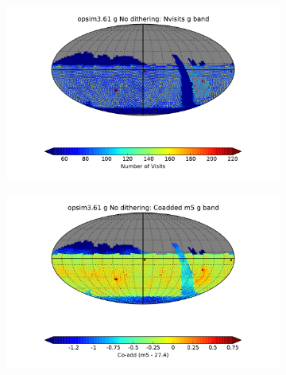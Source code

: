 \documentclass[]{spie}  %
\begin{document}
\begin{figure}
\begin{center}
\begin{subfigure}[b]{0.48\textwidth}
\includegraphics[width=\textwidth]{figures/opsim3_61_Nvisits_g_band_g_No_dithering_HEAL_SkyMap}
\caption{}
\label{subfig:gbanda}
\end{subfigure}
\begin{subfigure}[b]{0.48\textwidth}
\includegraphics[width=\textwidth]{figures/opsim3_61_Coadded_m5_g_band_g_No_dithering_HEAL_SkyMap}
\caption{}
\label{subfig:gbandb}
\end{subfigure}


\end{center}
\end{figure}
\end{document}
